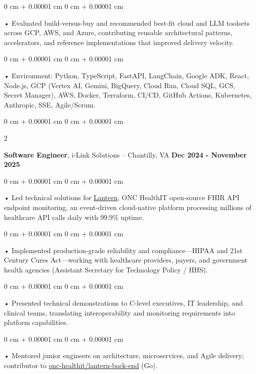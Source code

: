 \documentclass[10pt, letterpaper]{article}
\newenvironment{onecolentry}{
    \begin{adjustwidth}{
        0 cm + 0.00001 cm
    }{
        0 cm + 0.00001 cm
    }
}{
    \end{adjustwidth}
} %
\newenvironment{twocolentry}[2][]{
    \onecolentry
    \def\secondColumn{#2}
    \setcolumnwidth{\fill, 4.5 cm}
    \begin{paracol}{2}
}{
    \switchcolumn \raggedleft \secondColumn
    \end{paracol}
    \endonecolentry
} %
\begin{document}
        \begin{onecolentry}
             • Evaluated build-versus-buy and recommended best-fit cloud and LLM toolsets across GCP, AWS, and Azure, contributing reusable architectural patterns, accelerators, and reference implementations that improved delivery velocity.
        \end{onecolentry}
        \begin{onecolentry}
             • Environment: Python, TypeScript, FastAPI, LangChain, Google ADK, React, Node.js, GCP (Vertex AI, Gemini, BigQuery, Cloud Run, Cloud SQL, GCS, Secret Manager), AWS, Docker, Terraform, CI/CD, GitHub Actions, Kubernetes, Anthropic, SSE, Agile/Scrum.
        \end{onecolentry}

        \vspace{0.1cm}

        \begin{twocolentry}{
            \textbf{Dec 2024 - November 2025}
        }
            \textbf{Software Engineer}, i-Link Solutions -- Chantilly, VA\end{twocolentry}


        \begin{onecolentry}
             • Led technical solutions for \href{https://lantern.healthit.gov/?tab=dashboard_tab}{Lantern}, ONC HealthIT open-source FHIR API endpoint monitoring, an event-driven cloud-native platform processing millions of healthcare API calls daily with 99.9\% uptime.
        \end{onecolentry}
        \begin{onecolentry}
             • Implemented production-grade reliability and compliance---HIPAA and 21st Century Cures Act---working with healthcare providers, payers, and government health agencies (Assistant Secretary for Technology Policy / HHS).
        \end{onecolentry}
        \begin{onecolentry}
             • Presented technical demonstrations to C-level executives, IT leadership, and clinical teams, translating interoperability and monitoring requirements into platform capabilities.
        \end{onecolentry}
        \begin{onecolentry}
             • Mentored junior engineers on architecture, microservices, and Agile delivery; contributor to \href{https://github.com/onc-healthit/lantern-back-end}{onc-healthit/lantern-back-end} (Go).
        \end{onecolentry}
\end{document}
